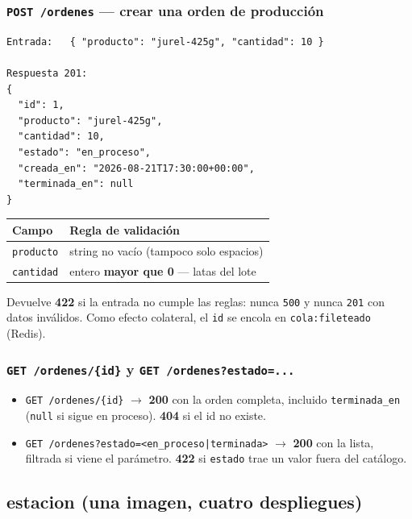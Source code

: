 \documentclass[12pt,a4paper]{article}
\begin{document}
\subsubsection*{\texttt{POST /ordenes} — crear una orden de producción}

\begin{lstlisting}
Entrada:   { "producto": "jurel-425g", "cantidad": 10 }

Respuesta 201:
{
  "id": 1,
  "producto": "jurel-425g",
  "cantidad": 10,
  "estado": "en_proceso",
  "creada_en": "2026-08-21T17:30:00+00:00",
  "terminada_en": null
}
\end{lstlisting}

\begin{table}[H]
\centering
\footnotesize
\begin{tabular}{@{}lp{9.6cm}@{}}
\toprule
\textbf{Campo} & \textbf{Regla de validación} \\
\midrule
\texttt{producto} & string no vacío (tampoco solo espacios) \\
\texttt{cantidad} & entero \textbf{mayor que 0} — latas del lote \\
\bottomrule
\end{tabular}
\end{table}

Devuelve \textbf{422} si la entrada no cumple las reglas: nunca \texttt{500} y
nunca \texttt{201} con datos inválidos. Como efecto colateral, el \texttt{id} se
encola en \texttt{cola:fileteado} (Redis).

\subsubsection*{\texttt{GET /ordenes/\{id\}} y \texttt{GET /ordenes?estado=...}}

\begin{itemize}[leftmargin=*, itemsep=1pt]
  \item \texttt{GET /ordenes/\{id\}} $\rightarrow$ \textbf{200} con la orden
        completa, incluido \texttt{terminada\_en} (\texttt{null} si sigue en
        proceso). \textbf{404} si el id no existe.
  \item \texttt{GET /ordenes?estado=<en\_proceso|terminada>} $\rightarrow$
        \textbf{200} con la lista, filtrada si viene el parámetro.
        \textbf{422} si \texttt{estado} trae un valor fuera del catálogo.
\end{itemize}

\subsection{estacion (una imagen, cuatro despliegues)}
\end{document}
